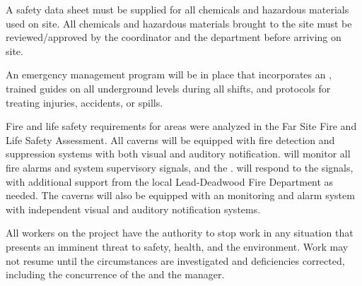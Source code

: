 A safety data sheet must be supplied for all chemicals and
hazardous materials used on site. All chemicals and hazardous
materials brought to the  site must be reviewed/approved by the
  coordinator and the  
department before arriving on site.

An emergency management program will be in place that incorporates an ,  trained guides on all underground levels during all shifts, and protocols for treating injuries, accidents, or spills.

Fire and life safety requirements for  areas
were analyzed in the  Far Site Fire and Life
Safety Assessment. All caverns will be equipped with fire detection
and suppression systems with both visual and auditory notification.  
 will monitor all fire alarms and system supervisory signals, and the  . 
will respond to the signals, with additional support from the local Lead-Deadwood Fire
Department as needed.  The caverns will also be equipped
with an  monitoring and alarm system with independent visual and
auditory notification systems.


All workers on the  project have the
authority to stop work in any situation that presents an imminent
threat to safety, health, and the environment. Work may not resume
until the circumstances are investigated and deficiencies corrected,
including the concurrence of the  
and the   manager.


